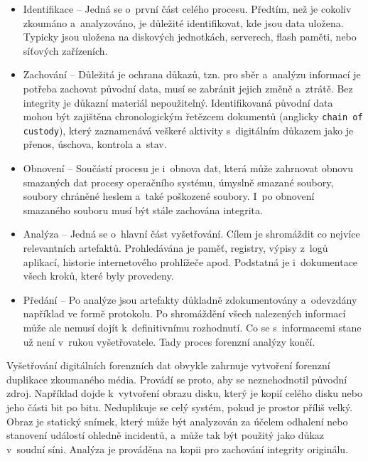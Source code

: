 \begin{itemize}
\item Identifikace -- Jedná se o~první část celého procesu. Předtím, než je cokoliv zkoumáno a~analyzováno, je důležité identifikovat, kde jsou data uložena. Typicky jsou uložena na diskových jednotkách, serverech, flash paměti, nebo síťových zařízeních.

\item Zachování -- Důležitá je ochrana důkazů, tzn. pro sběr a~analýzu informací je potřeba zachovat původní data, musí se zabránit jejich změně a~ztrátě. Bez integrity je důkazní materiál nepoužitelný. Identifikovaná původní data mohou být zajištěna chronologickým řetězcem dokumentů (anglicky \texttt{chain of custody}), který zaznamenává veškeré aktivity s~digitálním důkazem jako je přenos, úschova, kontrola a~stav.

\item Obnovení -- Součástí procesu je i~obnova dat, která může zahrnovat obnovu smazaných dat procesy operačního systému, úmyslně smazané soubory, soubory chráněné heslem a~také poškozené soubory. I~po obnovení smazaného souboru musí být stále zachována integrita.

\item Analýza -- Jedná se o~hlavní část vyšetřování. Cílem je shromáždit co nejvíce relevantních artefaktů. Prohledávána je paměť, registry, výpisy z~logů aplikací, historie internetového prohlížeče apod. Podstatná je i~dokumentace všech kroků, které byly provedeny.

\item Předání -- Po analýze jsou artefakty důkladně zdokumentovány a~odevzdány například ve formě protokolu. Po shromáždění všech nalezených informací může ale nemusí dojít k~definitivnímu rozhodnutí. Co se s~informacemi stane už není v~rukou vyšetřovatele. Tady proces forenzní analýzy končí.
\end{itemize}

\noindent Vyšetřování digitálních forenzních dat obvykle zahrnuje vytvoření forenzní duplikace zkoumaného média. Provádí se proto, aby se neznehodnotil původní zdroj. Například dojde k~vytvoření obrazu disku, který je kopií celého disku nebo jeho části bit po bitu. Neduplikuje se celý systém, pokud je prostor příliš velký. Obraz je statický snímek, který může být analyzován za účelem odhalení nebo stanovení událostí ohledně incidentů, a~může tak být použitý jako důkaz v~soudní síni. Analýza je prováděna na kopii pro zachování integrity originálu.

